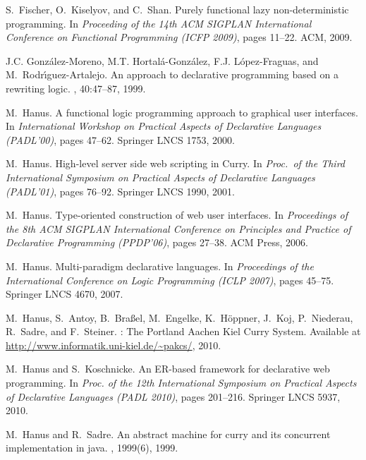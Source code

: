 \documentclass{llncs}
\begin{document}
\begin{thebibliography}{10}
S.~Fischer, O.~Kiselyov, and C.~Shan.
\newblock Purely functional lazy non-deterministic programming.
\newblock In {\em Proceeding of the 14th ACM SIGPLAN International Conference
  on Functional Programming (ICFP 2009)}, pages 11--22. ACM, 2009.

J.C. Gonz{\'a}lez-Moreno, M.T. Hortal{\'a}-Gonz{\'a}lez, F.J.
  L{\'o}pez-Fraguas, and M.~Rodr{\'\i}guez-Artalejo.
\newblock An approach to declarative programming based on a rewriting logic.
, 40:47--87, 1999.

M.~Hanus.
\newblock A functional logic programming approach to graphical user interfaces.
\newblock In {\em International Workshop on Practical Aspects of Declarative
  Languages (PADL'00)}, pages 47--62. Springer LNCS 1753, 2000.

M.~Hanus.
\newblock High-level server side web scripting in {Curry}.
\newblock In {\em Proc.\ of the Third International Symposium on Practical
  Aspects of Declarative Languages (PADL'01)}, pages 76--92. Springer LNCS
  1990, 2001.

M.~Hanus.
\newblock Type-oriented construction of web user interfaces.
\newblock In {\em Proceedings of the 8th ACM SIGPLAN International Conference
  on Principles and Practice of Declarative Programming (PPDP'06)}, pages
  27--38. ACM Press, 2006.

M.~Hanus.
\newblock Multi-paradigm declarative languages.
\newblock In {\em Proceedings of the International Conference on Logic
  Programming (ICLP 2007)}, pages 45--75. Springer LNCS 4670, 2007.

M.~Hanus, S.~Antoy, B.~Bra{\ss}el, M.~Engelke, K.~H{\"o}ppner, J.~Koj,
  P.~Niederau, R.~Sadre, and F.~Steiner.
: The {P}ortland {A}achen {K}iel {C}urry {S}ystem.
\newblock Available at \url{http://www.informatik.uni-kiel.de/~pakcs/}, 2010.

M.~Hanus and S.~Koschnicke.
\newblock An {ER-based} framework for declarative web programming.
\newblock In {\em Proc. of the 12th International Symposium on Practical
  Aspects of Declarative Languages (PADL 2010)}, pages 201--216. Springer LNCS
  5937, 2010.

M.~Hanus and R.~Sadre.
\newblock An abstract machine for curry and its concurrent implementation in
  java.
, 1999(6), 1999.


\end{thebibliography}
\end{document}

